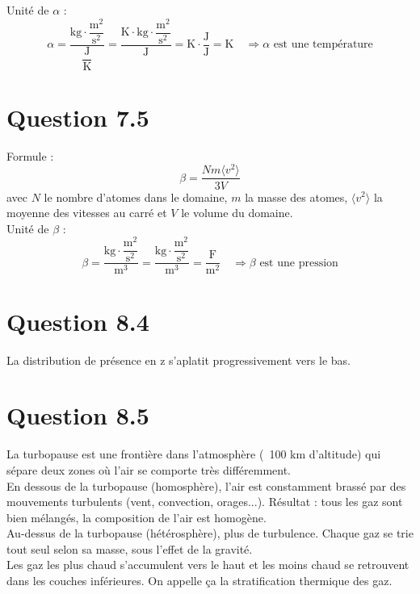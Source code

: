 \documentclass[a4paper]{article}
\begin{document}
    Unité de $\alpha$ :
    $$\alpha = \frac{\mathrm{kg} \cdot \dfrac{\mathrm{m}^2}{\mathrm{s}^2}}{\dfrac{\mathrm{J}}{\mathrm{K}}} = \frac{\mathrm{K} \cdot \mathrm{kg} \cdot \dfrac{\mathrm{m}^2}{\mathrm{s}^2}}{\mathrm{J}} = \mathrm{K} \cdot \frac{\mathrm{J}}{\mathrm{J}} = \mathrm{K} \quad \Rightarrow \alpha \text{ est une température}$$

    \section*{Question 7.5}
    Formule :
    $$\beta = \frac{Nm \langle v^2 \rangle}{3V}$$
    avec $N$ le nombre d'atomes dans le domaine, $m$ la masse des atomes, $\langle v^2 \rangle$ la moyenne des vitesses au carré et $V$ le volume du domaine.\\

    Unité de $\beta$ :
    $$\beta = \frac{\mathrm{kg} \cdot \dfrac{\mathrm{m}^2}{\mathrm{s}^2}}{\mathrm{m}^3} = \frac{\mathrm{kg} \cdot \dfrac{\mathrm{m}^2}{\mathrm{s}^2}}{\mathrm{m}^3} = \frac{\mathrm{F}}{\mathrm{m}^2} \quad \Rightarrow \beta \text{ est une pression}$$

\section*{Question 8.4}
    La distribution de présence en z s'aplatit progressivement vers le bas.

\section*{Question 8.5}
    La turbopause est une frontière dans l'atmosphère (~100 km d'altitude) qui sépare deux zones où l'air se comporte très différemment.\\

    En dessous de la turbopause (homosphère), l'air est constamment brassé par des mouvements turbulents (vent, convection, orages...).
    Résultat : tous les gaz sont bien mélangés, la composition de l'air est homogène.\\

    Au-dessus de la turbopause (hétérosphère),  plus de turbulence.
    Chaque gaz se trie tout seul selon sa masse, sous l'effet de la gravité.\\

    Les gaz les plus chaud s'accumulent vers le haut et les moins chaud se retrouvent dans les couches inférieures.
    On appelle ça la stratification thermique des gaz.
\end{document}
